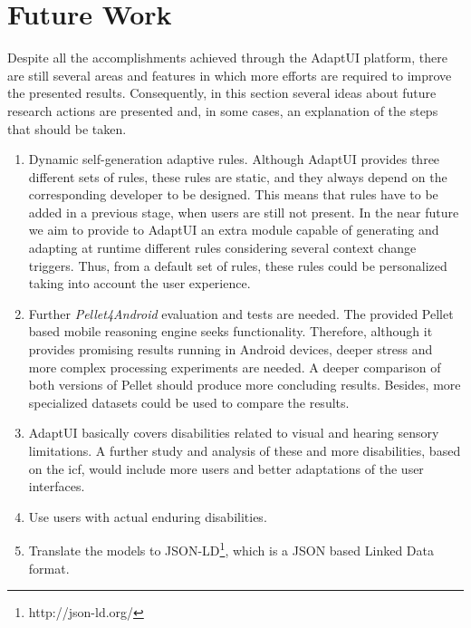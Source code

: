 \section{Future Work}
\label{sec:future_work}

Despite all the accomplishments achieved through the AdaptUI platform, there are 
still several areas and features in which more efforts are required to improve 
the presented results. Consequently, in this section several ideas about future
research actions are presented and, in some cases, an explanation of the steps 
that should be taken.

\begin{enumerate}[label=\alph*)]
  \item Dynamic self-generation adaptive rules. Although AdaptUI provides three 
  different sets of rules, these rules are static, and they always depend on 
  the corresponding developer to be designed. This means that rules have to 
  be added in a previous stage, when users are still not present. In the near 
  future we aim to provide to AdaptUI an extra module capable of generating and 
  adapting at runtime different rules considering several context change 
  triggers. Thus, from a default set of rules, these rules could be personalized 
  taking into account the user experience.
  
  \item Further \textit{Pellet4Android} evaluation and tests are needed. The
  provided Pellet based mobile reasoning engine seeks functionality. Therefore,
  although it provides promising results running in Android devices, deeper 
  stress and  more complex processing experiments are needed. A deeper comparison
  of both versions of Pellet should produce more concluding results. Besides, more
  specialized datasets could be used to compare the results.
  
  \item AdaptUI basically covers disabilities related to visual and hearing
  sensory limitations. A further study and analysis of these and more 
  disabilities, based on the \ac{icf}, would include more users and better 
  adaptations of the user interfaces.
  
  \item Use users with actual enduring disabilities.
  
  \item Translate the models to JSON-LD\footnote{http://json-ld.org/}, which is
  a JSON based Linked Data format.
  

\end{enumerate}
